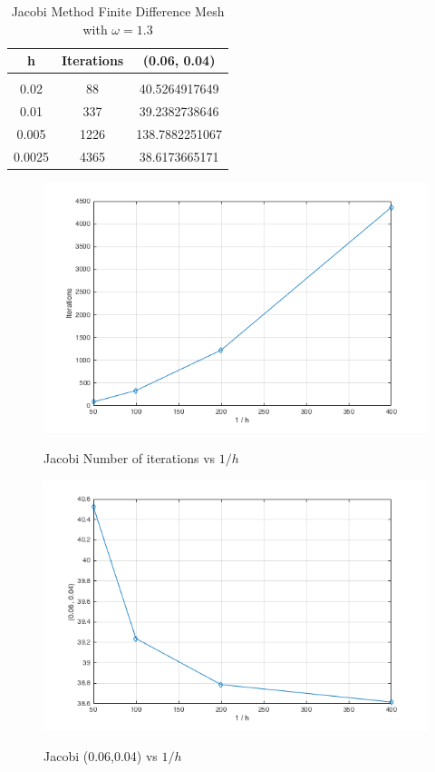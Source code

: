 \documentclass[11pt]{amsart}
\begin{document}
\begin{table}[h!]
    \caption{Jacobi Method Finite Difference Mesh with $\omega =1.3$}
    \label{tbl:fdm_mesh_3}
    \begin{tabular}{ c | c | c}
    	\textbf{h} & \textbf{Iterations} & \textbf{(0.06, 0.04)}\\ \hline \\
	0.02 & 88 & 40.5264917649\\
	0.01 & 337 & 39.2382738646\\
	0.005 & 1226 &138.7882251067\\
	0.0025 & 4365 & 38.6173665171
    \end{tabular}
\end{table}
\begin{center}
	\begin{figure}[h]
		\caption{Jacobi Number of iterations vs $1 / h$}
		\includegraphics[width=\textwidth]{assets/J_itr_v_1_o_h.png}\label{fig:J_itr_vs_1_o_h}
	\end{figure}
\end{center}
\begin{center}
	\begin{figure}[h]
		\caption{Jacobi (0.06,0.04) vs $1 / h$}
		\includegraphics[width=\textwidth]{assets/J_point_v_1_o_h.png}\label{fig:J_point_vs_1_o_h}
	\end{figure}
\end{center}
\end{document}
